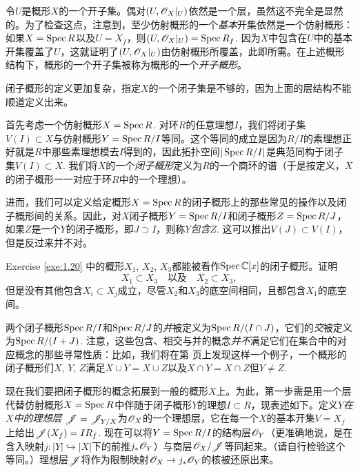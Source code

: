 令$U$是概形$X$的一个开子集。偶对$(U,\mathscr{O}_X|_U)$依然是一个层，虽然这不完全是显然的。为了检查这点，注意到，至少仿射概形的一个\textit{基本}开集依然是一个仿射概形：如果$X=\operatorname{Spec} R$以及$U=X_f$，则$(U,\mathscr{O}_X|_U)=\operatorname{Spec} R_f$. 因为$X$中包含在$U$中的基本开集覆盖了$U$，这就证明了$(U,\mathscr{O}_X|_U)$由仿射概形所覆盖，此即所需。在上述概形结构下，概形的一个开子集被称为概形的一个\textit{开子概形}。

闭子概形的定义更加复杂，指定$X$的一个闭子集是不够的，因为上面的层结构不能顺道定义出来。

首先考虑一个仿射概形$X=\operatorname{Spec} R$. 对环$R$的任意理想$I$，我们将闭子集$V(I)\subset X$与仿射概形$Y=\operatorname{Spec} R/I$等同。这个等同的成立是因为$R/I$的素理想正好就是$R$中那些素理想模去$I$得到的，因此拓扑空间$|\operatorname{Spec} R/I|$是典范同构于闭子集$V(I)\subset X$. 我们将$X$的一个\textit{闭子概形}定义为$R$的一个商环的谱（于是按定义，$X$的闭子概形一一对应于环$R$中的一个理想）。

进而，我们可以定义给定概形$X=\operatorname{Spec} R$的闭子概形上的那些常见的操作以及闭子概形间的关系。因此，对$X$闭子概形$Y=\operatorname{Spec} R/I$和闭子概形$Z=\operatorname{Spec} R/J$，如果$Z$是一个$Y$的闭子概形，即$J\supset I$，则称$Y$\textit{包含}$Z$. 这可以推出$V(J)\subset V(I)$，但是反过来并不对。

\begin{exe}\label{exe:1.26}
	Exercise \ref{exe:1.20} 中的概形$X_1$, $X_2$, $X_3$都能被看作$\operatorname{Spec} \mathbb{C}[x]$的闭子概形。证明
	\[
	X_1\subset X_3\quad \text{以及}\quad X_2\subset X_3,
	\]
	但是没有其他包含$X_i\subset X_j$成立，尽管$X_2$和$X_3$的底空间相同，且都包含$X_1$的底空间。
\end{exe}

两个闭子概形$\operatorname{Spec} R/I$和$\operatorname{Spec} R/J$的\textit{并}被定义为$\operatorname{Spec} R/(I\cap J)$，它们的\textit{交}被定义为$\operatorname{Spec} R/(I+J)$. 注意，这些包含、相交与并的概念\textit{并不}满足它们在集合中的对应概念的那些寻常性质：比如，我们将在第 \pageref{p:69} 页上发现这样一个例子，一个概形的闭子概形们$X$, $Y$, $Z$满足$X\cup Y=X\cup Z$以及$X\cap Y=X\cap Z$但$Y\neq Z$.

现在我们要把闭子概形的概念拓展到一般的概形$X$上。为此，第一步需是用一个层代替仿射概形$X=\operatorname{Spec} R$中伴随于闭子概形$Y$的理想$I\subset R$，现表述如下。定义$Y$\textit{在}$X$\textit{中的理想层} $\mathscr{J}=\mathscr{J}_{Y/X}$为$\mathscr{O}_X$的一个理想层，它在每一个$X$的基本开集$V=X_f$上给出$\mathscr{J}(X_f)=I R_f$. 现在可以将$Y=\operatorname{Spec} R/I$的结构层$\mathscr{O}_Y$（更准确地说，是在含入映射$j:|Y|\hookrightarrow |X|$下的前推$j_{*}\mathscr{O}_Y$）与商层$\mathscr{O}_X/\mathscr{J}$等同起来。（请自行检验这个等同。）理想层$\mathscr{J}$将作为限制映射$\mathscr{O}_X\to j_*\mathscr{O}_Y$的核被还原出来。

